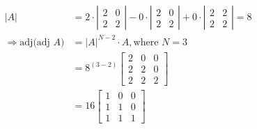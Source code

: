 \begin{solution}[\halfpage]
  \begin{align}
    |A| &= 2\cdot\left| \begin{array}{cc}
      2 & 0 \\
      2 & 2
    \end{array}\right| - 0\cdot\left| \begin{array}{cc}
      2 & 0 \\
      2 & 2
    \end{array}\right| + 0\cdot\left| \begin{array}{cc}
      2 & 2 \\
      2 & 2
    \end{array}\right| = 8 \\
    \Rightarrow \text{adj(adj $A$)} &= |A|^{N-2}\cdot A, \text{where } N = 3 \\
            &= 8^{(3-2)}\left[
              \begin{array}{ccc}
                2 & 0 & 0 \\
                2 & 2 & 0 \\
                2 & 2 & 2
              \end{array}
            \right] \\
            &= 16\left[
              \begin{array}{ccc}
                1 & 0 & 0 \\
                1 & 1 & 0 \\
                1 & 1 & 1
              \end{array}
            \right]
  \end{align}
\end{solution}
